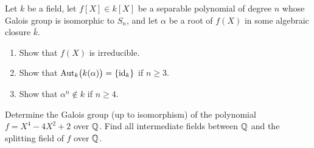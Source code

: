 \begin{problem}
  Let \(k\) be a field, let \(f[X]\in k[X]\) be a separable polynomial of
  degree \(n\) whose Galois group is isomorphic to \(S_n\), and let
  \(\alpha\) be a root of \(f(X)\) in some algebraic closure \(\bar k\).
  \begin{enumerate}[label=(\alph*)]
  \item Show that \(f(X)\) is irreducible.
  \item Show that \(\operatorname{Aut}_k\bigl( k(\alpha) \bigr)=\{\operatorname{id}_k\}\) if \(n\geq
    3\).
  \item Show that \(\alpha^n\notin k\) if \(n\geq 4\).
  \end{enumerate}
\end{problem}
\begin{solution}
\end{solution}

\begin{problem}
  Determine the Galois group (up to isomorphism) of the polynomial
  \(f=X^4-4X^2+2\) over \(\mathbb{Q}\). Find all intermediate fields between
  \(\mathbb{Q}\) and the splitting field of \(f\) over \(\mathbb{Q}\).
\end{problem}
\begin{solution}
\end{solution}

